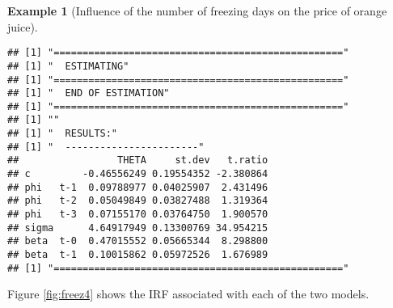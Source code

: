 \documentclass[
  12pt,
]{book}
\theoremstyle{definition}
\theoremstyle{definition}
\newtheorem{example}{Example}[chapter]
\theoremstyle{definition}
\theoremstyle{definition}
\theoremstyle{remark}
\begin{document}
\begin{example}[Influence of the number of freezing days on the price of orange juice]
\begin{verbatim}
## [1] "=================================================="
## [1] "  ESTIMATING"
## [1] "=================================================="
## [1] "  END OF ESTIMATION"
## [1] "=================================================="
## [1] ""
## [1] "  RESULTS:"
## [1] "  -----------------------"
##                 THETA     st.dev   t.ratio
## c         -0.46556249 0.19554352 -2.380864
## phi   t-1  0.09788977 0.04025907  2.431496
## phi   t-2  0.05049849 0.03827488  1.319364
## phi   t-3  0.07155170 0.03764750  1.900570
## sigma      4.64917949 0.13300769 34.954215
## beta  t-0  0.47015552 0.05665344  8.298800
## beta  t-1  0.10015862 0.05972526  1.676989
## [1] "=================================================="
\end{verbatim}

Figure \ref{fig:freez4} shows the IRF associated with each of the two models.


\end{example}
\end{document}
